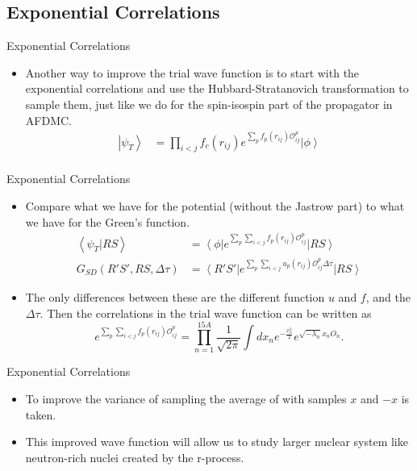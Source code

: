 \documentclass{beamer}
\newcommand{\ket}[1]{\left| #1 \right>}
\newcommand{\bra}[1]{\left< #1 \right|}
\newcommand{\braket}[2]{\left< #1 | #2 \right>}
\newcommand{\fpij}{f_p(r_{ij})}
\newcommand{\Opij}{\mathcal{O}_{ij}^p}
\newcommand{\dt}{\Delta\tau}
\begin{document}
\subsection{Exponential Correlations}
\begin{frame}{Exponential Correlations}
\begin{itemize}
   \item Another way to improve the trial wave function is to start with the exponential correlations and use the Hubbard-Stratanovich transformation to sample them, just like we do for the spin-isospin part of the propagator in AFDMC.
   \begin{align*}
       \ket{\psi_T} &= \prod\limits_{i<j}f_c(r_{ij}) e^{\sum\limits_p\fpij\Opij} \ket{\phi} \\
   \end{align*}
\end{itemize}
\end{frame}

\begin{frame}{Exponential Correlations}
\begin{itemize}
   \item Compare what we have for the potential (without the Jastrow part) to what we have for the Green's function.
   \begin{align*}
       \braket{\psi_T}{RS} &= \bra{\phi} e^{\sum\limits_p\sum\limits_{i<j}\fpij\Opij} \ket{RS} \\
      G_{SD}(R'S',RS,\dt) &= \bra {R'S'} e^{\sum\limits_p\sum\limits_{i<j}u_p(r_{ij})\Opij\dt} \ket{RS}
   \end{align*}
   \item The only differences between these are the different function $u$ and $f$, and the $\dt$. Then the correlations in the trial wave function can be written as
   \begin{equation*}
      e^{\sum\limits_p\sum\limits_{i<j}\fpij\Opij} = \prod\limits_{n=1}^{15A}\frac{1}{\sqrt{2\pi}}\int dx_n e^{-\frac{x_n^2}{2}}e^{\sqrt{-\lambda_n} x_nO_n}.
   \end{equation*}
\end{itemize}
\end{frame}

\begin{frame}{Exponential Correlations}
\begin{itemize}
   \item To improve the variance of sampling the average of with samples $x$ and $-x$ is taken.
   \item This improved wave function will allow us to study larger nuclear system like neutron-rich nuclei created by the r-process.
\end{itemize}
\end{frame}
\end{document}
